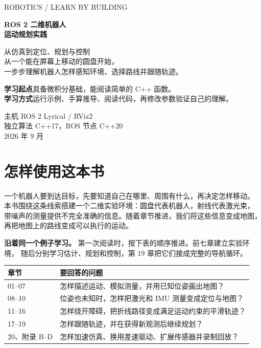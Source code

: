 \documentclass[UTF8,fontset=none,a4paper,zihao=5,oneside,openany]{ctexbook}
\begin{document}
\hypersetup{pageanchor=false}
\begin{titlepage}
\setlength{\parindent}{0pt}
\thispagestyle{empty}
{\sffamily\color{tealblue}ROBOTICS / LEARN BY BUILDING}\par
\vspace{30mm}
{\sffamily\bfseries\fontsize{30}{40}\selectfont\color{navy}
ROS 2 二维机器人\\运动规划实践}\par
\vspace{10mm}

{\Large 从仿真到定位、规划与控制}\\[8mm]
从一个能在屏幕上移动的圆盘开始，\\
一步步理解机器人怎样感知环境、选择路线并跟随轨迹。
\vspace{20mm}

\begin{notebox}
\textbf{学习起点}\quad 具备微积分基础，能阅读简单的 C++ 函数。\\
\textbf{学习方式}\quad 运行示例、手算推导、阅读代码，再修改参数验证自己的理解。
\end{notebox}
\vfill
主机 ROS 2 Lyrical / RViz2\\
独立算法 C++17，ROS 节点 C++20\\[3mm]
2026 年 9 月
\end{titlepage}
\frontmatter
\hypersetup{pageanchor=true}
\chapter*{怎样使用这本书}
一个机器人要到达目标，先要知道自己在哪里、周围有什么，再决定怎样移动。
本书围绕这条线索搭建一个二维实验环境：圆盘代表机器人，射线代表激光束，
带噪声的测量提供不完全准确的信息。随着章节推进，我们将这些信息变成地图，
再把地图上的路线变成可以执行的运动。

\textbf{沿着同一个例子学习。}
第一次阅读时，按下表的顺序推进。前七章建立实验环境，
随后分别学习估计、规划和控制，第 19 章把它们接成完整的导航循环。
\begin{center}
\begin{tabularx}{\linewidth}{@{}lX@{}}
\toprule
章节 & 要回答的问题\\
\midrule
01--07 & 怎样描述运动、模拟测量，并用已知位姿画出地图？\\
08--10 & 位姿也未知时，怎样把激光和 IMU 测量变成定位与地图？\\
11--16 & 怎样绕开障碍，把折线路径变成满足运动约束的平滑轨迹？\\
17--19 & 怎样跟随轨迹，并在获得新观测后继续规划？\\
20、附录 B--D & 怎样加速仿真、换用差速驱动、扩展传感器并录制回放？\\
\bottomrule
\end{tabularx}
\end{center}
\end{document}
